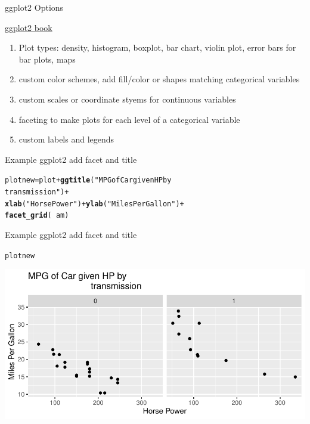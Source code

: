 \documentclass{beamer}\usepackage[]{graphicx}\usepackage[]{xcolor}
\makeatletter
\newcommand{\hlstr}[1]{\textcolor[rgb]{0.192,0.494,0.8}{#1}}%
\newcommand{\hlopt}[1]{\textcolor[rgb]{0,0,0}{#1}}%
\newcommand{\hlstd}[1]{\textcolor[rgb]{0.345,0.345,0.345}{#1}}%
\newcommand{\hlkwb}[1]{\textcolor[rgb]{0.69,0.353,0.396}{#1}}%
\newcommand{\hlkwd}[1]{\textcolor[rgb]{0.737,0.353,0.396}{\textbf{#1}}}%
\newenvironment{kframe}{%
 \def\at@end@of@kframe{}%
 \ifinner\ifhmode%
  \def\at@end@of@kframe{\end{minipage}}%
  \begin{minipage}{\columnwidth}%
 \fi\fi%
 \def\FrameCommand##1{\hskip\@totalleftmargin \hskip-\fboxsep
 \colorbox{shadecolor}{##1}\hskip-\fboxsep
     \hskip-\linewidth \hskip-\@totalleftmargin \hskip\columnwidth}%
 \MakeFramed {\advance\hsize-\width
   \@totalleftmargin\z@ \linewidth\hsize
   \@setminipage}}%
 {\par\unskip\endMakeFramed%
 \at@end@of@kframe}
\newenvironment{knitrout}{}{} %
\makeatother
\begin{document}
\begin{frame}{ggplot2 Options}

\href{https://ggplot2-book.org/}{ggplot2 book}
\begin{enumerate}
\item Plot types:  density, histogram, boxplot, bar chart, violin plot, error bars for bar plots, maps
\item custom color schemes, add fill/color or shapes matching categorical variables
\item custom scales or coordinate styems for continuous variables
\item faceting to make plots for each level of a categorical variable
\item custom labels and legends
\end{enumerate}

\end{frame}

\begin{frame}[fragile]{Example ggplot2 add facet and title}
\begin{knitrout}
\color{fgcolor}\begin{kframe}
\begin{alltt}
\hlstd{plotnew} \hlkwb{=} \hlstd{plot} \hlopt{+} \hlkwd{ggtitle}\hlstd{(}\hlstr{"MPG of Car given HP by
                         transmission"}\hlstd{)} \hlopt{+}
    \hlkwd{xlab}\hlstd{(}\hlstr{"Horse Power"}\hlstd{)} \hlopt{+} \hlkwd{ylab}\hlstd{(}\hlstr{"Miles Per Gallon"}\hlstd{)} \hlopt{+}
    \hlkwd{facet_grid}\hlstd{(}\hlopt{~}\hlstd{am)}
\end{alltt}
\end{kframe}
\end{knitrout}
\end{frame}


\begin{frame}[fragile]{Example ggplot2 add facet and title}
\begin{knitrout}
\color{fgcolor}\begin{kframe}
\begin{alltt}
\hlstd{plotnew}
\end{alltt}
\end{kframe}
\includegraphics[width=0.95\linewidth]{figure/unnamed-chunk-4-1} 
\end{knitrout}
\end{frame}
\end{document}
